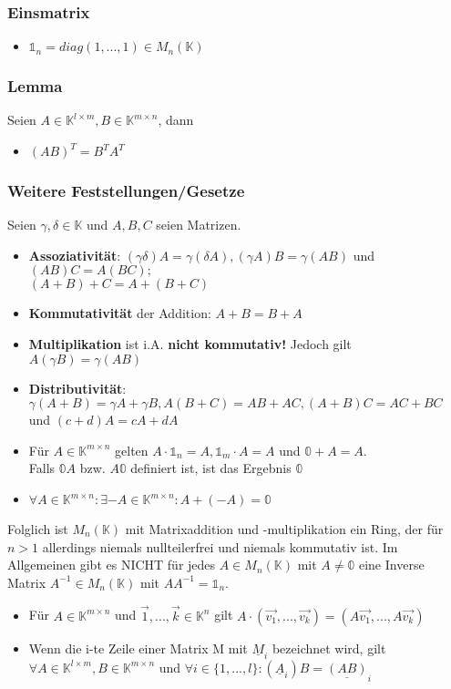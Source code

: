 \documentclass[titlepage]{article}
\newcommand{\K}{\mathbb{K}}
\newcommand{\1}{\mathbb{1}}
\newcommand{\0}{\mathbb{0}}
\begin{document}
				\subsubsection{Einsmatrix}
					\begin{itemize}
						\item $\mathbb{1}_n=diag(1,...,1)\in M_n(\K)$
					\end{itemize}
				\subsubsection{Lemma}
					Seien $A\in\K^{l\times m},B\in\K^{m\times n}$, dann
					\begin{itemize}
						\item $(AB)^T=B^TA^T$
					\end{itemize}
				\subsubsection{Weitere Feststellungen/Gesetze}
					Seien $\gamma,\delta\in\K$ und $A,B,C$ seien Matrizen.
					\begin{itemize}
						\item \textbf{Assoziativität}: $(\gamma\delta)A=\gamma(\delta A),(\gamma A)B=\gamma(AB)$ und $(AB)C=A(BC);$\\$(A+B)+C=A+(B+C)$
						\item \textbf{Kommutativität} der Addition: $A+B=B+A$
						\item \textbf{Multiplikation} ist i.A. \textbf{nicht kommutativ!} Jedoch gilt $A(\gamma B)=\gamma(AB)$
						\item \textbf{Distributivität}: $\gamma(A+B)=\gamma A+\gamma B,A(B+C)=AB+AC,(A+B)C=AC+BC$ und $(c+d)A=cA+dA$
						\item Für $A\in\K^{m\times n}$ gelten $A\cdot\mathbb{1}_n=A,\mathbb{1}_m\cdot A=A$ und $\mathbb{0}+A=A$.
						\\Falls $\mathbb{0}A$ bzw. $A\mathbb{0}$ definiert ist, ist das Ergebnis $\mathbb{0}$
						\item $\forall A\in\K^{m\times n}:\exists-A\in\K^{m\times n}:A+(-A)=\mathbb{0}$
					\end{itemize}
					Folglich ist $M_n(\K)$ mit Matrixaddition und -multiplikation ein Ring, der für $n>1$ allerdings niemals nullteilerfrei und niemals kommutativ ist. Im Allgemeinen gibt es NICHT für jedes $A\in M_n(\K)$ mit $A\neq\mathbb{0}$ eine Inverse Matrix $A^{-1}\in M_n(\K)$ mit $AA^{-1}=\mathbb{1}_n$.
					\begin{itemize}
						\item Für $A\in\K^{m\times n}$ und $\vec{1},...,\vec{k}\in\K^n$ gilt $A\cdot(\vec{v_1},...,\vec{v_k})=(A\vec{v_1},...,A\vec{v_k})$
						\item Wenn die i-te Zeile einer Matrix M mit $\underline{M}_i$ bezeichnet wird, gilt $\forall A\in\K^{l\times m},B\in\K^{m\times n}$ und $\forall i\in\{1,...,l\}:(\underline{A}_i)B=\underline{(AB)}_i$
					\end{itemize}
\end{document}
